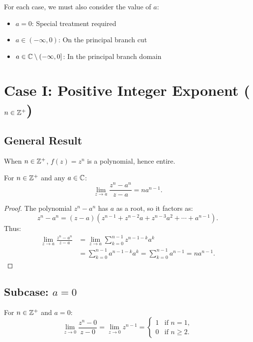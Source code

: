 For each case, we must also consider the value of $a$:
\begin{itemize}
    \item $a = 0$: Special treatment required
    \item $a \in (-\infty, 0)$: On the principal branch cut
    \item $a \in \mathbb{C} \setminus (-\infty, 0]$: In the principal branch domain
\end{itemize}

\section{Case I: Positive Integer Exponent ($n \in \mathbb{Z}^+$)}

\subsection{General Result}

When $n \in \mathbb{Z}^+$, $f(z) = z^n$ is a polynomial, hence entire.

\begin{theorem}
For $n \in \mathbb{Z}^+$ and any $a \in \mathbb{C}$:
\begin{equation}
\lim_{z \to a} \frac{z^n - a^n}{z - a} = n a^{n-1}.
\end{equation}
\end{theorem}

\begin{proof}
The polynomial $z^n - a^n$ has $a$ as a root, so it factors as:
\begin{equation}
z^n - a^n = (z - a)(z^{n-1} + z^{n-2}a + z^{n-3}a^2 + \cdots + a^{n-1}).
\end{equation}
Thus:
\begin{align}
\lim_{z \to a} \frac{z^n - a^n}{z - a} &= \lim_{z \to a} \sum_{k=0}^{n-1} z^{n-1-k} a^k \\
&= \sum_{k=0}^{n-1} a^{n-1-k} a^k = \sum_{k=0}^{n-1} a^{n-1} = n a^{n-1}.
\end{align}
\end{proof}

\subsection{Subcase: $a = 0$}

\begin{proposition}
For $n \in \mathbb{Z}^+$ and $a = 0$:
\begin{equation}
\lim_{z \to 0} \frac{z^n - 0}{z - 0} = \lim_{z \to 0} z^{n-1} = 
\begin{cases}
1 & \text{if } n = 1, \\
0 & \text{if } n \geq 2.
\end{cases}
\end{equation}
\end{proposition}

